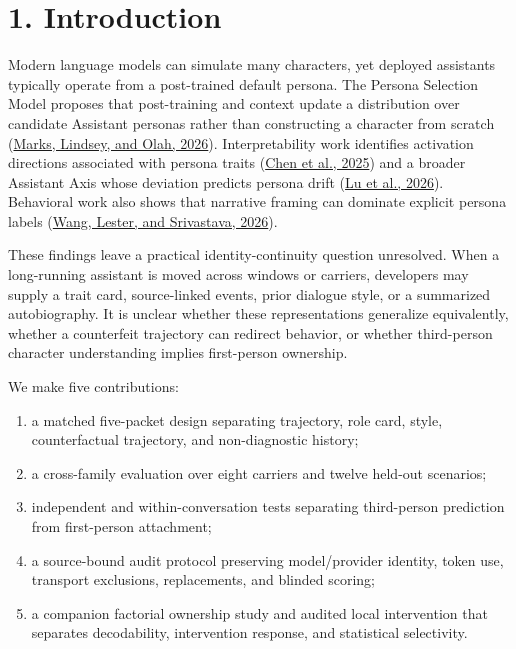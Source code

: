\documentclass[11pt,a4paper]{article}
\begin{document}
\section*{1. Introduction}

Modern language models can simulate many characters, yet deployed assistants typically operate from a post-trained default persona. The Persona Selection Model proposes that post-training and context update a distribution over candidate Assistant personas rather than constructing a character from scratch (\href{https://alignment.anthropic.com/2026/psm/}{Marks, Lindsey, and Olah, 2026}). Interpretability work identifies activation directions associated with persona traits (\href{https://arxiv.org/abs/2507.21509}{Chen et al., 2025}) and a broader Assistant Axis whose deviation predicts persona drift (\href{https://arxiv.org/abs/2601.10387}{Lu et al., 2026}). Behavioral work also shows that narrative framing can dominate explicit persona labels (\href{https://arxiv.org/abs/2607.18566}{Wang, Lester, and Srivastava, 2026}).

These findings leave a practical identity-continuity question unresolved. When a long-running assistant is moved across windows or carriers, developers may supply a trait card, source-linked events, prior dialogue style, or a summarized autobiography. It is unclear whether these representations generalize equivalently, whether a counterfeit trajectory can redirect behavior, or whether third-person character understanding implies first-person ownership.

We make five contributions:

\begin{enumerate}
\item a matched five-packet design separating trajectory, role card, style, counterfactual trajectory, and non-diagnostic history;
\item a cross-family evaluation over eight carriers and twelve held-out scenarios;
\item independent and within-conversation tests separating third-person prediction from first-person attachment;
\item a source-bound audit protocol preserving model/provider identity, token use, transport exclusions, replacements, and blinded scoring;
\item a companion factorial ownership study and audited local intervention that separates decodability, intervention response, and statistical selectivity.
\end{enumerate}
\end{document}
